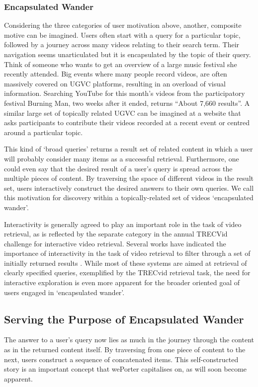 \subsubsection{Encapsulated Wander}
Considering the three categories of user motivation above, another, composite motive can be imagined. Users often start with a query for a particular topic, followed by a journey across many videos relating to their search term. Their navigation seems unarticulated but it is encapsulated by the topic of their query. Think of someone who wants to get an overview of a large music festival she recently attended. Big events where many people record videos, are often massively covered on UGVC platforms, resulting in an overload of visual information. Searching YouTube for this month's videos from the participatory festival Burning Man, two weeks after it ended, returns ``About 7,660 results''\cite{youtubeBM}. A similar large set of topically related UGVC can be imagined at a website that asks participants to contribute their videos recorded at a recent event or centred around a particular topic.

This kind of `broad queries' returns a result set of related content in which a user will probably consider many items as a successful retrieval. Furthermore, one could even say that the desired result of a user's query is spread across the multiple pieces of content. By traversing the space of different videos in the result set, users interactively construct the desired answers to their own queries. We call this motivation for discovery within a topically-related set of videos `encapsulated wander'.

Interactivity is generally agreed to play an important role in the task of video retrieval, as is reflected by the separate category in the annual TRECVid challenge for interactive video retrieval\cite{Smeaton:2006ww}. Several works have indicated the importance of interactivity in the task of video retrieval to filter through a set of initially returned results \cite{DeRooij:2007ua, Christel:2004wm, DeRooij:2007ua, DeRooij:2008ut}. While most of these systems are aimed at retrieval of clearly specified queries, exemplified by the TRECvid retrieval task, the need for interactive exploration is even more apparent for the broader oriented goal of users engaged in `encapsulated wander'.

\subsection{Serving the Purpose of Encapsulated Wander}
The answer to a user's query now lies as much in the journey through the content as in the returned content itself. By traversing from one piece of content to the next, users construct a sequence of concatenated items. This self-constructed story is an important concept that wePorter capitalises on, as will soon become apparent.


